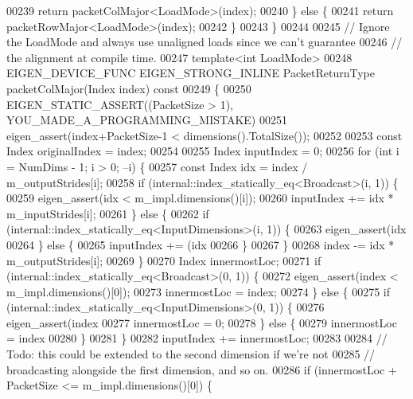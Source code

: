 \begin{DoxyCode}
00239       \textcolor{keywordflow}{return} packetColMajor<LoadMode>(index);
00240     \} \textcolor{keywordflow}{else} \{
00241       \textcolor{keywordflow}{return} packetRowMajor<LoadMode>(index);
00242     \}
00243   \}
00244 
00245   \textcolor{comment}{// Ignore the LoadMode and always use unaligned loads since we can't guarantee}
00246   \textcolor{comment}{// the alignment at compile time.}
00247   \textcolor{keyword}{template}<\textcolor{keywordtype}{int} LoadMode>
00248   EIGEN\_DEVICE\_FUNC EIGEN\_STRONG\_INLINE PacketReturnType packetColMajor(Index index)\textcolor{keyword}{ const}
00249 \textcolor{keyword}{  }\{
00250     EIGEN\_STATIC\_ASSERT((PacketSize > 1), YOU\_MADE\_A\_PROGRAMMING\_MISTAKE)
00251     eigen\_assert(index+PacketSize-1 < dimensions().TotalSize());
00252 
00253     \textcolor{keyword}{const} Index originalIndex = index;
00254 
00255     Index inputIndex = 0;
00256     \textcolor{keywordflow}{for} (\textcolor{keywordtype}{int} i = NumDims - 1; i > 0; --i) \{
00257       \textcolor{keyword}{const} Index idx = index / m\_outputStrides[i];
00258       \textcolor{keywordflow}{if} (internal::index\_statically\_eq<Broadcast>(i, 1)) \{
00259         eigen\_assert(idx < m\_impl.dimensions()[i]);
00260         inputIndex += idx * m\_inputStrides[i];
00261       \} \textcolor{keywordflow}{else} \{
00262         \textcolor{keywordflow}{if} (internal::index\_statically\_eq<InputDimensions>(i, 1)) \{
00263           eigen\_assert(idx %
00264         \} \textcolor{keywordflow}{else} \{
00265           inputIndex += (idx %
00266         \}
00267       \}
00268       index -= idx * m\_outputStrides[i];
00269     \}
00270     Index innermostLoc;
00271     \textcolor{keywordflow}{if} (internal::index\_statically\_eq<Broadcast>(0, 1)) \{
00272       eigen\_assert(index < m\_impl.dimensions()[0]);
00273       innermostLoc = index;
00274     \} \textcolor{keywordflow}{else} \{
00275       \textcolor{keywordflow}{if} (internal::index\_statically\_eq<InputDimensions>(0, 1)) \{
00276         eigen\_assert(index %
00277         innermostLoc = 0;
00278       \} \textcolor{keywordflow}{else} \{
00279         innermostLoc = index %
00280       \}
00281     \}
00282     inputIndex += innermostLoc;
00283 
00284     \textcolor{comment}{// Todo: this could be extended to the second dimension if we're not}
00285     \textcolor{comment}{// broadcasting alongside the first dimension, and so on.}
00286     \textcolor{keywordflow}{if} (innermostLoc + PacketSize <= m\_impl.dimensions()[0]) \{

\end{DoxyCode}

